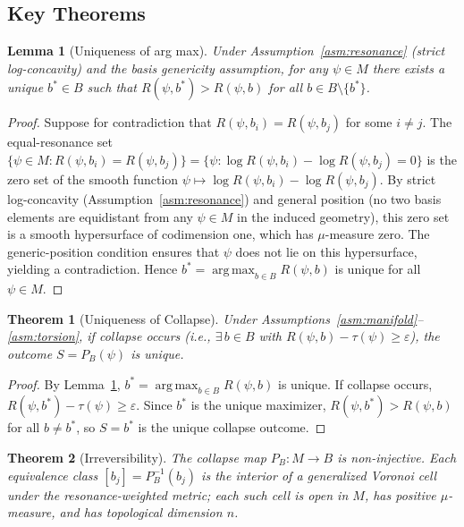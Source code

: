 \documentclass[11pt]{article}
\theoremstyle{plain}
\newtheorem{lemma}{Lemma}[section]
\newtheorem{theorem}{Theorem}[section]
\DeclareMathOperator*{\argmax}{arg\,max}
\begin{document}
\subsection{Key Theorems}\label{sec:theorems}

\begin{lemma}[Uniqueness of arg max]\label{lem:argmax}
Under Assumption~\ref{asm:resonance} (strict log-concavity) and the basis genericity assumption,
for any $\psi \in M$ there exists a unique $b^* \in B$ such that $R(\psi, b^*) > R(\psi, b)$ for all
$b \in B \setminus \{b^*\}$.
\end{lemma}

\begin{proof}
Suppose for contradiction that $R(\psi, b_i) = R(\psi, b_j)$ for some $i \neq j$. The
equal-resonance set
$\{\psi \in M : R(\psi, b_i) = R(\psi, b_j)\} = \{\psi : \log R(\psi, b_i) - \log R(\psi, b_j) = 0\}$
is the zero set of the smooth function $\psi \mapsto \log R(\psi, b_i) - \log R(\psi, b_j)$. By
strict log-concavity (Assumption~\ref{asm:resonance}) and general position (no two basis elements
are equidistant from any $\psi \in M$ in the induced geometry), this zero set is a smooth
hypersurface of codimension one, which has $\mu$-measure zero. The generic-position condition
ensures that $\psi$ does not lie on this hypersurface, yielding a contradiction. Hence
$b^* = \argmax_{b \in B} R(\psi, b)$ is unique for all $\psi \in M$.
\end{proof}

\begin{theorem}[Uniqueness of Collapse]\label{thm:uniqueness}
Under Assumptions~\ref{asm:manifold}--\ref{asm:torsion}, if collapse occurs (i.e.,
$\exists\, b \in B$ with $R(\psi, b) - \tau(\psi) \geq \varepsilon$), the outcome $S = P_B(\psi)$
is unique.
\end{theorem}

\begin{proof}
By Lemma~\ref{lem:argmax}, $b^* = \argmax_{b \in B} R(\psi, b)$ is unique. If collapse occurs,
$R(\psi, b^*) - \tau(\psi) \geq \varepsilon$. Since $b^*$ is the unique maximizer,
$R(\psi, b^*) > R(\psi, b)$ for all $b \neq b^*$, so $S = b^*$ is the unique collapse outcome.
\end{proof}

\begin{theorem}[Irreversibility]\label{thm:irreversibility}
The collapse map $P_B : M \to B$ is non-injective. Each equivalence class
$[b_j] = P_B^{-1}(b_j)$ is the interior of a generalized Voronoi cell under the resonance-weighted
metric; each such cell is open in $M$, has positive $\mu$-measure, and has topological dimension
$n$.
\end{theorem}
\end{document}
